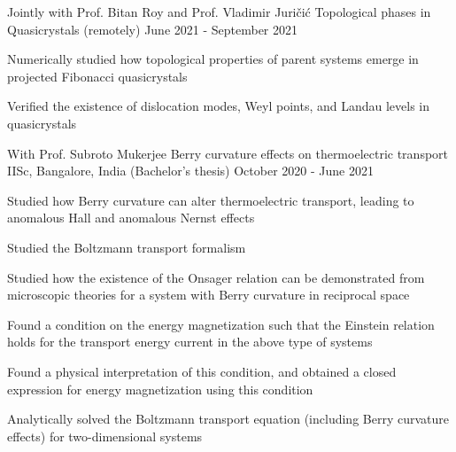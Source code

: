 

\begin{cventries}

\cventry
{Jointly with Prof. Bitan Roy and Prof. Vladimir Juri\v{c}i\'c} %
{Topological phases in Quasicrystals} %
{(remotely)} %
{June 2021 - September 2021} %
{
	\begin{cvitems} %
		\item {Numerically studied how topological properties of parent systems emerge in projected Fibonacci quasicrystals}
		\item {Verified the existence of dislocation modes, Weyl points, and Landau levels in quasicrystals}
	\end{cvitems}
}

\cventry
{With Prof. Subroto Mukerjee} %
{Berry curvature effects on thermoelectric transport} %
{IISc, Bangalore, India \space \space\space\space\space\space\space\space\space\space\space(Bachelor's thesis)} %
{October 2020 - June 2021} %
{
	\begin{cvitems} %
		\item {Studied how Berry curvature can alter thermoelectric transport, leading to anomalous Hall and anomalous Nernst effects}
		\item {Studied the Boltzmann transport formalism}
		\item {Studied how the existence of the Onsager relation can be demonstrated from microscopic theories for a system with Berry curvature in reciprocal space}
		\item {Found a condition on the energy magnetization such that the Einstein relation holds for the transport energy current in the above type of systems}
		\item {Found a physical interpretation of this condition, and obtained a closed expression for energy magnetization using this condition}
		\item {Analytically solved the Boltzmann transport equation (including Berry curvature effects) for two-dimensional systems}
	\end{cvitems}
}
	

\end{cventries}
